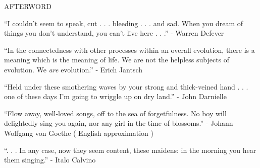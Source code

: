 \documentclass[10pt]{article}
\begin{document}
\begingroup
\begin{center}
\huge
\end{center}
\endgroup

\begingroup
\begin{center}
\huge AFTERWORD
\end{center}
\endgroup

\vspace*{2\baselineskip}

\begingroup
\begin{center}
``I couldn't seem to speak, cut . . . bleeding . . . and sad. When you dream of things you don't understand, you can't live here . . .''
\rightskip\leftskip
\phantom{text} \hfill - Warren Defever
\end{center}
\endgroup

\vspace*{4\baselineskip}

\begingroup
\begin{center}
``In the connectedness with other processes within an overall evolution, there is a meaning which is the meaning of life. We are not the helpless subjects of evolution. We  \textit{are} evolution.'' 
\rightskip\leftskip
\phantom{text} \hfill - Erich Jantsch
\end{center}
\endgroup

\vspace*{4\baselineskip}

\begingroup
\begin{center}
``Held under these smothering waves by your strong and thick-veined hand . . . one of these days I'm going to wriggle up on dry land.''
\rightskip\leftskip
\phantom{text} \hfill - John Darnielle
\end{center}
\endgroup

\vspace*{4\baselineskip}

\begingroup
\begin{center}
``Flow away, well-loved songs, off to the sea of forgetfulness. No boy will delightedly sing you again, nor any girl in the time of blossoms.''
\rightskip\leftskip
\phantom{text} \hfill - Johann Wolfgang von Goethe ( English approximation )
\end{center}
\endgroup

\vspace*{4\baselineskip}

\begingroup
\begin{center}
``. . . In any case, now they seem content, these maidens: in the morning you hear them singing.''
\rightskip\leftskip
\phantom{text} \hfill - Italo Calvino
\end{center}
\endgroup
\end{document}
